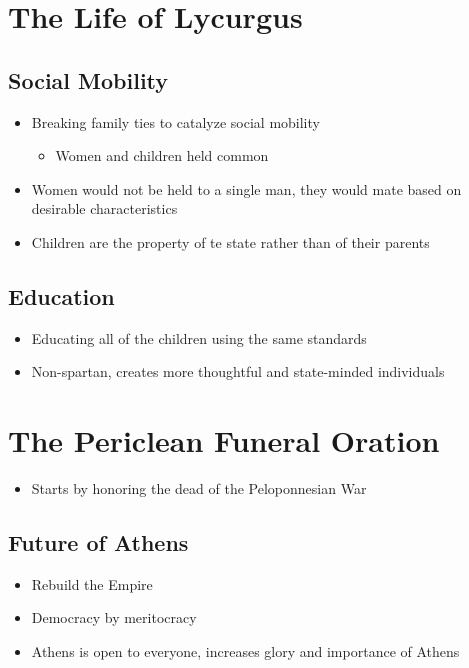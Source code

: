 \documentclass[11pt]{article}
\begin{document}
\section{The Life of Lycurgus}
\label{sec:orgfe168e6}
\subsection{Social Mobility}
\label{sec:orgb4494bc}
\begin{itemize}
\item Breaking family ties to catalyze social mobility
\begin{itemize}
\item Women and children held common
\end{itemize}
\item Women would not be held to a single man, they would mate based on desirable characteristics
\item Children are the property of te state rather than of their parents
\end{itemize}
\subsection{Education}
\label{sec:orgdc54b80}
\begin{itemize}
\item Educating all of the children using the same standards
\item Non-spartan, creates more thoughtful and state-minded individuals
\end{itemize}
\section{The Periclean Funeral Oration}
\label{sec:orgcad9be5}
\begin{itemize}
\item Starts by honoring the dead of the Peloponnesian War
\end{itemize}
\subsection{Future of Athens}
\label{sec:org49921b4}
\begin{itemize}
\item Rebuild the Empire
\item Democracy by meritocracy
\item Athens is open to everyone, increases glory and importance of Athens
\end{itemize}
\end{document}
